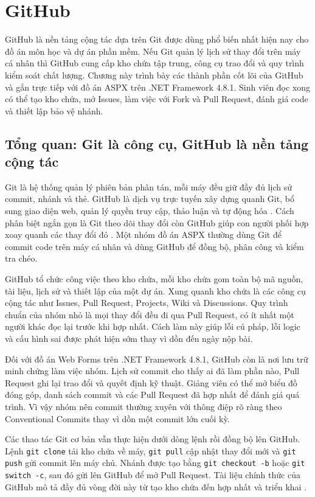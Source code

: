 \section{GitHub}
\label{sec:c4-github}
GitHub là nền tảng cộng tác dựa trên Git được dùng phổ biến nhất hiện nay cho đồ án môn học và dự án phần mềm.
Nếu Git quản lý lịch sử thay đổi trên máy cá nhân thì GitHub cung cấp kho chứa tập trung, công cụ trao đổi và quy trình kiểm soát chất lượng.
Chương này trình bày các thành phần cốt lõi của GitHub và gắn trực tiếp với đồ án ASPX trên .NET Framework 4.8.1.
Sinh viên đọc xong có thể tạo kho chứa, mở Issues, làm việc với Fork và Pull Request, đánh giá code và thiết lập bảo vệ nhánh.

\subsection{Tổng quan: Git là công cụ, GitHub là nền tảng cộng tác}
\label{subsec:c4-tong-quan}
Git là hệ thống quản lý phiên bản phân tán, mỗi máy đều giữ đầy đủ lịch sử commit, nhánh và thẻ.
GitHub là dịch vụ trực tuyến xây dựng quanh Git, bổ sung giao diện web, quản lý quyền truy cập, thảo luận và tự động hóa \cite{githubdocs}.
Cách phân biệt ngắn gọn là Git theo dõi thay đổi còn GitHub giúp con người phối hợp xoay quanh các thay đổi đó \cite{progit}.
Một nhóm đồ án ASPX thường dùng Git để commit code trên máy cá nhân và dùng GitHub để đồng bộ, phân công và kiểm tra chéo.

GitHub tổ chức công việc theo kho chứa, mỗi kho chứa gom toàn bộ mã nguồn, tài liệu, lịch sử và thiết lập của một dự án.
Xung quanh kho chứa là các công cụ cộng tác như Issues, Pull Request, Projects, Wiki và Discussions.
Quy trình chuẩn của nhóm nhỏ là mọi thay đổi đều đi qua Pull Request, có ít nhất một người khác đọc lại trước khi hợp nhất.
Cách làm này giúp lỗi cú pháp, lỗi logic và cấu hình sai được phát hiện sớm thay vì dồn đến ngày nộp bài.

Đối với đồ án Web Forms trên .NET Framework 4.8.1, GitHub còn là nơi lưu trữ minh chứng làm việc nhóm.
Lịch sử commit cho thấy ai đã làm phần nào, Pull Request ghi lại trao đổi và quyết định kỹ thuật.
Giảng viên có thể mở biểu đồ đóng góp, danh sách commit và các Pull Request đã hợp nhất để đánh giá quá trình.
Vì vậy nhóm nên commit thường xuyên với thông điệp rõ ràng theo Conventional Commits \cite{convcommits} thay vì dồn một commit lớn cuối kỳ.

Các thao tác Git cơ bản vẫn thực hiện dưới dòng lệnh rồi đồng bộ lên GitHub.
Lệnh \verb|git clone| tải kho chứa về máy, \verb|git pull| cập nhật thay đổi mới và \verb|git push| gửi commit lên máy chủ.
Nhánh được tạo bằng \verb|git checkout -b| hoặc \verb|git switch -c|, sau đó gửi lên GitHub để mở Pull Request.
Tài liệu chính thức của GitHub mô tả đầy đủ vòng đời này từ tạo kho chứa đến hợp nhất và triển khai \cite{githubdocs}.

